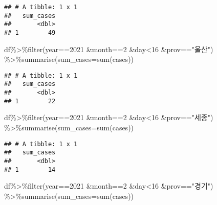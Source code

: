 \documentclass[
]{article}
\newenvironment{Shaded}{\begin{snugshade}}{\end{snugshade}}
\newcommand{\AttributeTok}[1]{\textcolor[rgb]{0.77,0.63,0.00}{#1}}
\newcommand{\DecValTok}[1]{\textcolor[rgb]{0.00,0.00,0.81}{#1}}
\newcommand{\FunctionTok}[1]{\textcolor[rgb]{0.00,0.00,0.00}{#1}}
\newcommand{\NormalTok}[1]{#1}
\newcommand{\SpecialCharTok}[1]{\textcolor[rgb]{0.00,0.00,0.00}{#1}}
\newcommand{\StringTok}[1]{\textcolor[rgb]{0.31,0.60,0.02}{#1}}
\begin{document}
\begin{verbatim}
## # A tibble: 1 x 1
##   sum_cases
##       <dbl>
## 1        49
\end{verbatim}

\begin{Shaded}
\begin{Highlighting}[]
\NormalTok{df}\SpecialCharTok{\%\textgreater{}\%}\FunctionTok{filter}\NormalTok{(year}\SpecialCharTok{==}\DecValTok{2021} \SpecialCharTok{\&}\NormalTok{month}\SpecialCharTok{==}\DecValTok{2} \SpecialCharTok{\&}\NormalTok{day}\SpecialCharTok{\textless{}}\DecValTok{16} \SpecialCharTok{\&}\NormalTok{prov}\SpecialCharTok{==}\StringTok{"울산"}\NormalTok{) }\SpecialCharTok{\%\textgreater{}\%}\FunctionTok{summarise}\NormalTok{(}\AttributeTok{sum\_cases=}\FunctionTok{sum}\NormalTok{(cases))}
\end{Highlighting}
\end{Shaded}

\begin{verbatim}
## # A tibble: 1 x 1
##   sum_cases
##       <dbl>
## 1        22
\end{verbatim}

\begin{Shaded}
\begin{Highlighting}[]
\NormalTok{df}\SpecialCharTok{\%\textgreater{}\%}\FunctionTok{filter}\NormalTok{(year}\SpecialCharTok{==}\DecValTok{2021} \SpecialCharTok{\&}\NormalTok{month}\SpecialCharTok{==}\DecValTok{2} \SpecialCharTok{\&}\NormalTok{day}\SpecialCharTok{\textless{}}\DecValTok{16} \SpecialCharTok{\&}\NormalTok{prov}\SpecialCharTok{==}\StringTok{"세종"}\NormalTok{) }\SpecialCharTok{\%\textgreater{}\%}\FunctionTok{summarise}\NormalTok{(}\AttributeTok{sum\_cases=}\FunctionTok{sum}\NormalTok{(cases))}
\end{Highlighting}
\end{Shaded}

\begin{verbatim}
## # A tibble: 1 x 1
##   sum_cases
##       <dbl>
## 1        14
\end{verbatim}

\begin{Shaded}
\begin{Highlighting}[]
\NormalTok{df}\SpecialCharTok{\%\textgreater{}\%}\FunctionTok{filter}\NormalTok{(year}\SpecialCharTok{==}\DecValTok{2021} \SpecialCharTok{\&}\NormalTok{month}\SpecialCharTok{==}\DecValTok{2} \SpecialCharTok{\&}\NormalTok{day}\SpecialCharTok{\textless{}}\DecValTok{16} \SpecialCharTok{\&}\NormalTok{prov}\SpecialCharTok{==}\StringTok{"경기"}\NormalTok{) }\SpecialCharTok{\%\textgreater{}\%}\FunctionTok{summarise}\NormalTok{(}\AttributeTok{sum\_cases=}\FunctionTok{sum}\NormalTok{(cases))}
\end{Highlighting}
\end{Shaded}
\end{document}
